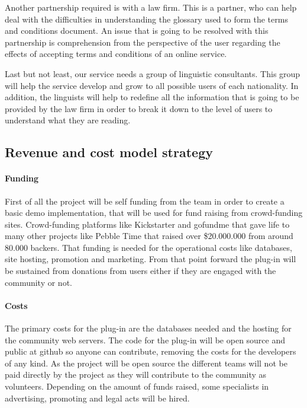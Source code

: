 Another partnership required is with a law firm. This is a partner, who can help 
deal with the difficulties in understanding the glossary used to form the terms 
and conditions document. An issue that is going to be resolved with this 
partnership is comprehension from the perspective of the user regarding the 
effects of accepting  terms and conditions of an online service.

Last but not least, our service needs a group of linguistic consultants. This 
group will help the service develop and grow to all possible users of each 
nationality. In addition, the linguists will help to redefine all the 
information that is going to be provided by the law firm in order to break it 
down to the level of users to understand what they are reading.

\subsection{Revenue and cost model strategy}

\paragraph{Funding}
First of all the project will be self funding from the team in order to create a 
basic demo implementation, that will be used for fund raising from crowd-funding 
sites. Crowd-funding platforms like Kickstarter and gofundme that 
gave life to many other projects like Pebble Time that raised over \$20.000.000 
from around 80.000 backers. That funding is needed for the operational costs 
like databases, site hosting, promotion and marketing. From that point forward 
the plug-in will be sustained from donations from users either if they are 
engaged with the community or not.

\paragraph{Costs}
The primary costs for the plug-in are the databases needed and the hosting for 
the community web servers. The code for the plug-in will be open source and 
public at github so anyone can contribute, removing the costs for the developers 
of any kind. As the project will be open source the different teams will not be 
paid directly by the project as they will contribute to the community as 
volunteers. Depending on the amount of funds raised, some specialists in 
advertising, promoting and legal acts will be hired.

